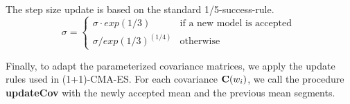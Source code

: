 The step size update is based on the standard 1/5-success-rule.
\begin{equation}
  \sigma = \begin{cases} 
    \sigma \cdot exp(1/3) & \text{if a new model is accepted } \\
    \sigma / exp(1/3)^{(1/4)} & \text{otherwise }
  \end{cases}
\end{equation}  

Finally, to adapt the parameterized covariance matrices, we apply the update rules used in (1+1)-CMA-ES.
For each covariance $\mathbf{C}(w_i)$, we call the procedure \textbf{updateCov} with
the newly accepted mean and the previous mean segments.




